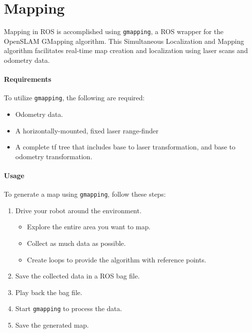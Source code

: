 \section{Mapping}

Mapping in ROS is accomplished using \texttt{gmapping}, a ROS wrapper for the OpenSLAM GMapping algorithm. 
This Simultaneous Localization and Mapping algorithm facilitates real-time map creation and localization using laser scans and odometry data.

\paragraph*{Requirements}
To utilize \texttt{gmapping}, the following are required:
\begin{itemize}
    \item Odometry data. 
    \item A horizontally-mounted, fixed laser range-finder
    \item A complete tf tree that includes base to laser transformation, and base to odometry transformation.
\end{itemize}

\paragraph*{Usage}
To generate a map using \texttt{gmapping}, follow these steps:
\begin{enumerate}
    \item Drive your robot around the environment.
        \begin{itemize}
            \item Explore the entire area you want to map.
            \item Collect as much data as possible.
            \item Create loops to provide the algorithm with reference points.
        \end{itemize}
    \item Save the collected data in a ROS bag file.
    \item Play back the bag file.
    \item Start \texttt{gmapping} to process the data.
    \item Save the generated map.
\end{enumerate}

